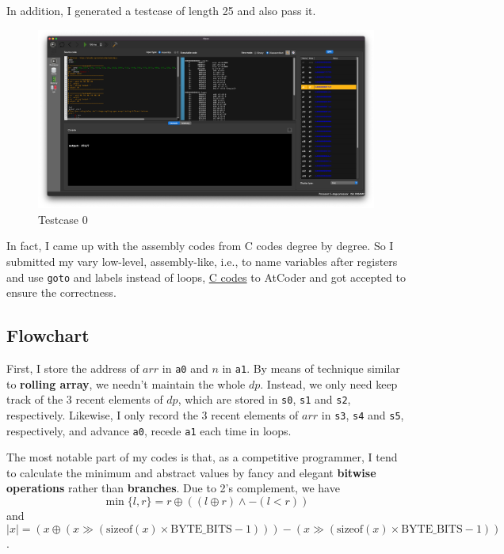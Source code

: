 \documentclass[12pt, a4paper]{article}
\begin{document}
In addition, I generated a testcase of length 25 and also pass it.

\begin{figure}[htbp]
\centering
\includegraphics[width=\linewidth]{tc0}
\caption{Testcase 0}
\label{fig:tc0}
\end{figure}

In fact, I came up with the assembly codes from C codes degree by degree. So I submitted my vary low-level, assembly-like, i.e., to name variables after registers and use \texttt{goto} and labels instead of loops, \href{https://atcoder.jp/contests/dp/submissions/41496401}{C codes} to AtCoder and got accepted to ensure the correctness.

\subsection{Flowchart}

First, I store the address of $arr$ in \texttt{a0} and $n$ in \texttt{a1}. By means of technique similar to \textbf{rolling array}, we needn't maintain the whole $dp$. Instead, we only need keep track of the 3 recent elements of $dp$, which are stored in \texttt{s0}, \texttt{s1} and \texttt{s2}, respectively. Likewise, I only record the 3 recent elements of $arr$ in \texttt{s3}, \texttt{s4} and \texttt{s5}, respectively, and advance \texttt{a0}, recede \texttt{a1} each time in loops.

The most notable part of my codes is that, as a competitive programmer, I tend to calculate the minimum and abstract values by fancy and elegant \textbf{bitwise operations} rather than \textbf{branches}. Due to 2's complement, we have $$\min\{l,r\}=r\oplus((l\oplus r)\land-(l<r))$$ and $$|x|=(x\oplus(x\gg(\text{sizeof}(x)\times\text{BYTE\_BITS}-1)))-(x\gg(\text{sizeof}(x)\times\text{BYTE\_BITS}-1))$$.
\end{document}
